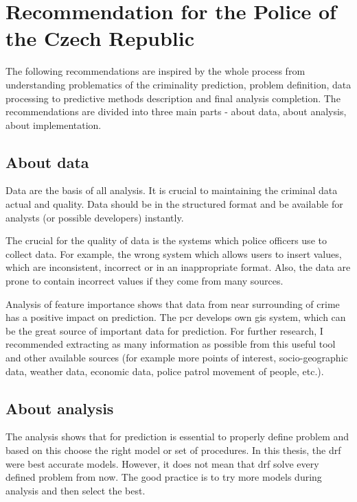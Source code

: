 \documentclass[thesis=M,english]{FITthesis}[2012/10/20]
\begin{document}

\chapter{Recommendation for the Police of the Czech Republic}\label{sec:recommendation}

The following recommendations are inspired by the whole process from understanding problematics of the criminality prediction, problem definition, data processing to predictive methods description and final analysis completion. The recommendations are divided into three main parts - about data, about analysis, about implementation.  

\section{About data}

Data are the basis of all analysis. It is crucial to maintaining the criminal data actual and quality. Data should be in the structured format and be available for analysts (or possible developers) instantly.

The crucial for the quality of data is the systems which police officers use to collect data. For example, the wrong system which allows users to insert values, which are inconsistent, incorrect or in an inappropriate format. Also, the data are prone to contain incorrect values if they come from many sources. 

Analysis of feature importance shows that data from near surrounding of crime has a positive impact on prediction. The \gls{pcr} develops own \gls{gis} system, which can be the great source of important data for prediction. For further research, I recommended extracting as many information as possible from this useful tool and other available sources (for example more points of interest, socio-geographic data, weather data, economic data, police patrol movement of people, etc.).


\newpage
\section{About analysis}

The analysis shows that for prediction is essential to properly define problem and based on this choose the right model or set of procedures. In this thesis, the \gls{drf} were best accurate models. However, it does not mean that \gls{drf} solve every defined problem from now. The good practice is to try more models during analysis and then select the best. 
\end{document}

